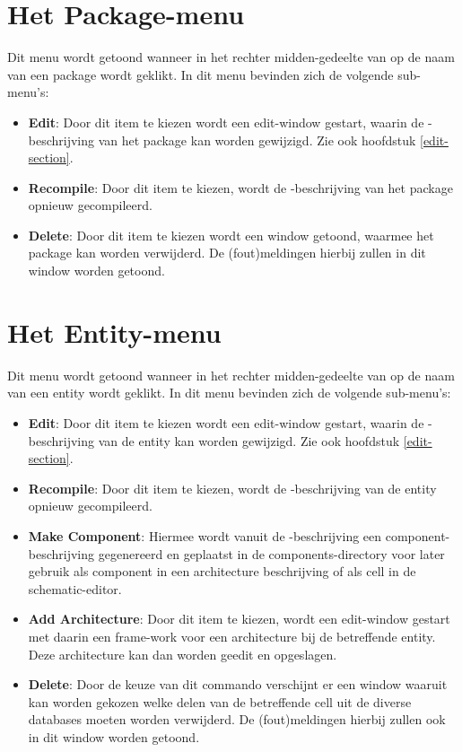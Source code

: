 \section{Het Package-menu}
Dit menu wordt getoond wanneer in het rechter midden-gedeelte van 
op de naam van een package wordt geklikt.
In dit menu bevinden zich de volgende sub-menu's:
\begin{itemize}
\item {\bf Edit}: Door dit item te kiezen wordt een edit-window gestart, waarin de
             -beschrijving van het package kan worden gewijzigd.
Zie ook hoofdstuk \ref{edit-section}.
\item {\bf Recompile}: Door dit item te kiezen, wordt de -beschrijving van
                  het package opnieuw gecompileerd.
\item {\bf Delete}: Door dit item te kiezen wordt een window getoond, waarmee het
             package kan worden verwijderd. De (fout)meldingen hierbij zullen
             in dit window worden getoond.
\end{itemize}

\section{Het Entity-menu}
Dit menu wordt getoond wanneer in het rechter midden-gedeelte van 
op de naam van een entity wordt geklikt.
In dit menu bevinden zich de volgende sub-menu's:
\begin{itemize}
\item {\bf Edit}: Door dit item te kiezen wordt een edit-window gestart, waarin de
             -beschrijving van de entity kan worden gewijzigd.
Zie ook hoofdstuk \ref{edit-section}.
\item {\bf Recompile}: Door dit item te kiezen, wordt de -beschrijving van
                  de  entity opnieuw gecompileerd.
\item {\bf Make Component}: Hiermee wordt vanuit de -beschrijving
                     een component-beschrijving gegenereerd en geplaatst in de
                     components-directory voor later gebruik als component
                     in een architecture beschrijving of als cell in de
                     schematic-editor.
\item {\bf Add Architecture}: Door dit item te kiezen, wordt een edit-window
                         gestart met daarin een frame-work voor een
                         architecture bij de betreffende entity. Deze
                         architecture kan dan worden geedit en opgeslagen.
\item {\bf Delete}: Door de keuze van dit commando verschijnt er een window
                waaruit kan worden gekozen welke delen van de betreffende
                cell uit de diverse databases moeten worden verwij\-derd.
                De (fout)meldingen hierbij zullen ook in dit window worden
                getoond.
\end{itemize}

